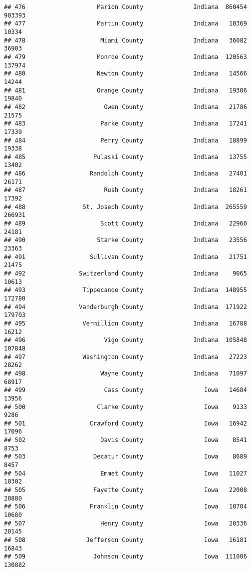 \documentclass[
]{article}
\begin{document}
\begin{verbatim}
## 476                    Marion County              Indiana  860454  903393
## 477                    Martin County              Indiana   10369   10334
## 478                     Miami County              Indiana   36082   36903
## 479                    Monroe County              Indiana  120563  137974
## 480                    Newton County              Indiana   14566   14244
## 481                    Orange County              Indiana   19306   19840
## 482                      Owen County              Indiana   21786   21575
## 483                     Parke County              Indiana   17241   17339
## 484                     Perry County              Indiana   18899   19338
## 485                   Pulaski County              Indiana   13755   13402
## 486                  Randolph County              Indiana   27401   26171
## 487                      Rush County              Indiana   18261   17392
## 488                St. Joseph County              Indiana  265559  266931
## 489                     Scott County              Indiana   22960   24181
## 490                    Starke County              Indiana   23556   23363
## 491                  Sullivan County              Indiana   21751   21475
## 492               Switzerland County              Indiana    9065   10613
## 493                Tippecanoe County              Indiana  148955  172780
## 494               Vanderburgh County              Indiana  171922  179703
## 495                Vermillion County              Indiana   16788   16212
## 496                      Vigo County              Indiana  105848  107848
## 497                Washington County              Indiana   27223   28262
## 498                     Wayne County              Indiana   71097   68917
## 499                      Cass County                 Iowa   14684   13956
## 500                    Clarke County                 Iowa    9133    9286
## 501                  Crawford County                 Iowa   16942   17096
## 502                     Davis County                 Iowa    8541    8753
## 503                   Decatur County                 Iowa    8689    8457
## 504                     Emmet County                 Iowa   11027   10302
## 505                   Fayette County                 Iowa   22008   20880
## 506                  Franklin County                 Iowa   10704   10680
## 507                     Henry County                 Iowa   20336   20145
## 508                 Jefferson County                 Iowa   16181   16843
## 509                   Johnson County                 Iowa  111006  130882

\end{verbatim}
\end{document}
